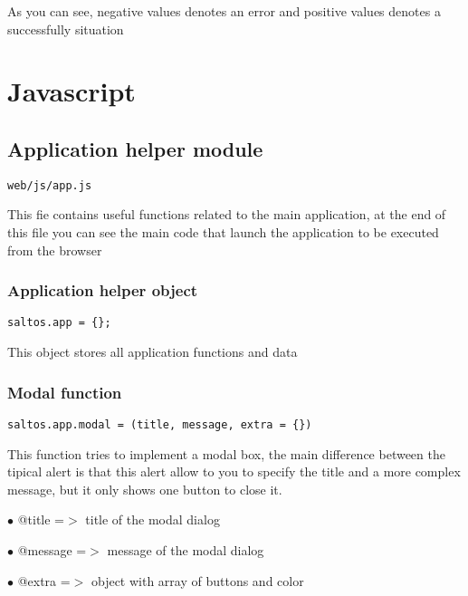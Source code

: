 \documentclass[a4paper]{article}
\begin{document}
As you can see, negative values denotes an error and positive values denotes a successfully situation


\hypertarget{toc559}{}
\section{Javascript}

\hypertarget{toc560}{}
\subsection{Application helper module}

\begin{lstlisting}
web/js/app.js
\end{lstlisting}

This fie contains useful functions related to the main application, at the end of this file you
can see the main code that launch the application to be executed from the browser

\hypertarget{toc561}{}
\subsubsection{Application helper object}

\begin{lstlisting}
saltos.app = {};
\end{lstlisting}

This object stores all application functions and data

\hypertarget{toc562}{}
\subsubsection{Modal function}

\begin{lstlisting}
saltos.app.modal = (title, message, extra = {})
\end{lstlisting}

This function tries to implement a modal box, the main difference between the tipical alert
is that this alert allow to you to specify the title and a more complex message, but it only
shows one button to close it.

\begin{compactitem}
\item[\color{myblue}$\bullet$] @title   =$>$ title of the modal dialog
\item[\color{myblue}$\bullet$] @message =$>$ message of the modal dialog
\item[\color{myblue}$\bullet$] @extra   =$>$ object with array of buttons and color
\end{compactitem}
\end{document}
